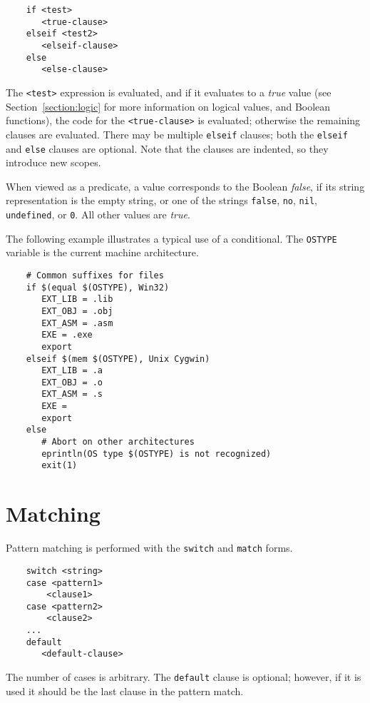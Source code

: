 \begin{verbatim}
    if <test>
       <true-clause>
    elseif <test2>
       <elseif-clause>
    else
       <else-clause>
\end{verbatim}

The \verb+<test>+ expression is evaluated, and if it evaluates to a \emph{true} value (see
Section~\ref{section:logic} for more information on logical values, and Boolean functions), the code
for the \verb+<true-clause>+ is evaluated; otherwise the remaining clauses are evaluated.  There may
be multiple \verb+elseif+ clauses; both the \verb+elseif+ and \verb+else+ clauses are optional.
Note that the clauses are indented, so they introduce new scopes.

When viewed as a predicate, a value corresponds to the Boolean \emph{false}, if its string
representation is the empty string, or one of the strings \verb+false+, \verb+no+, \verb+nil+,
\verb+undefined+, or \verb+0+.  All other values are \emph{true}.

The following example illustrates a typical use of a conditional.  The
\verb+OSTYPE+ variable is the current machine architecture.

\begin{verbatim}
    # Common suffixes for files
    if $(equal $(OSTYPE), Win32)
       EXT_LIB = .lib
       EXT_OBJ = .obj
       EXT_ASM = .asm
       EXE = .exe
       export
    elseif $(mem $(OSTYPE), Unix Cygwin)
       EXT_LIB = .a
       EXT_OBJ = .o
       EXT_ASM = .s
       EXE =
       export
    else
       # Abort on other architectures
       eprintln(OS type $(OSTYPE) is not recognized)
       exit(1)
\end{verbatim}

\section{Matching}
\label{section:match}

Pattern matching is performed with the \verb+switch+ and \verb+match+ forms.

\begin{verbatim}
    switch <string>
    case <pattern1>
        <clause1>
    case <pattern2>
        <clause2>
    ...
    default
       <default-clause>
\end{verbatim}

The number of cases is arbitrary.
The \verb+default+ clause is optional; however, if it is used it should
be the last clause in the pattern match.

